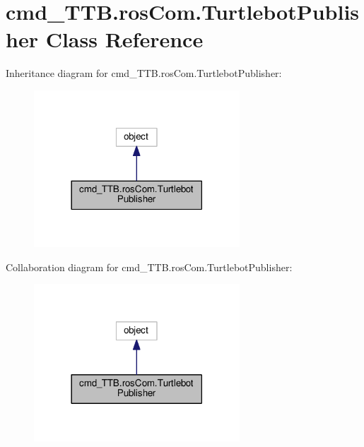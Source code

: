 \hypertarget{classcmd__TTB_1_1rosCom_1_1TurtlebotPublisher}{}\section{cmd\+\_\+\+T\+T\+B.\+ros\+Com.\+Turtlebot\+Publisher Class Reference}
\label{classcmd__TTB_1_1rosCom_1_1TurtlebotPublisher}


Inheritance diagram for cmd\+\_\+\+T\+T\+B.\+ros\+Com.\+Turtlebot\+Publisher\+:\nopagebreak
\begin{figure}[H]
\begin{center}
\leavevmode
\includegraphics[width=218pt]{classcmd__TTB_1_1rosCom_1_1TurtlebotPublisher__inherit__graph}
\end{center}
\end{figure}


Collaboration diagram for cmd\+\_\+\+T\+T\+B.\+ros\+Com.\+Turtlebot\+Publisher\+:\nopagebreak
\begin{figure}[H]
\begin{center}
\leavevmode
\includegraphics[width=218pt]{classcmd__TTB_1_1rosCom_1_1TurtlebotPublisher__coll__graph}
\end{center}
\end{figure}
